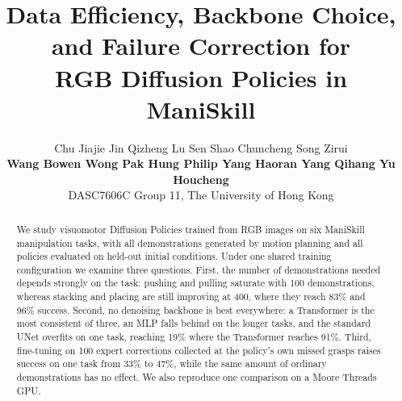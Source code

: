 \documentclass{article}
\title{Data Efficiency, Backbone Choice,\\
  and Failure Correction for\\
  RGB Diffusion Policies in ManiSkill}
\author{Chu Jiajie \quad Jin Qizheng \quad Lu Sen \quad Shao Chuncheng \quad
  Song Zirui\\
  \textbf{Wang Bowen \quad Wong Pak Hung Philip \quad Yang Haoran \quad
  Yang Qihang \quad Yu Houcheng}\\[3pt]
  DASC7606C Group 11, The University of Hong Kong}
\begin{document}
\maketitle
\begin{abstract}
We study visuomotor Diffusion Policies trained from RGB images on six ManiSkill
manipulation tasks, with all demonstrations generated by motion planning and
all policies evaluated on held-out initial conditions. Under one shared
training configuration we examine three questions. First, the number of
demonstrations needed depends strongly on the task: pushing and pulling
saturate with 100 demonstrations, whereas stacking and placing are still
improving at 400, where they reach 83\% and 96\% success. Second, no denoising
backbone is best everywhere: a Transformer is the most consistent of three, an
MLP falls behind on the longer tasks, and the standard UNet overfits on one
task, reaching 19\% where the Transformer reaches 91\%. Third, fine-tuning on
100 expert corrections collected at the policy's own missed grasps raises
success on one task from 33\% to 47\%, while the same amount of ordinary
demonstrations has no effect. We also reproduce one comparison on a Moore
Threads GPU.
\end{abstract}








\clearpage



\clearpage
\appendix
\raggedbottom

\end{document}
